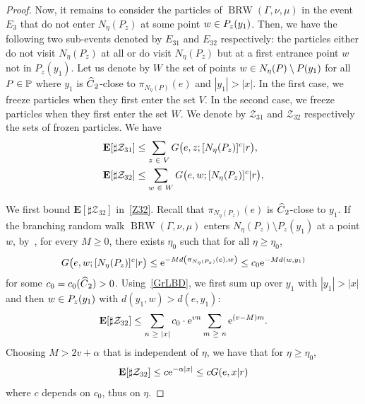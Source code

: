 \documentclass[AHL,Unicode,longabstracts]{cedram}
\newcommand{\bbP}{\mathbb{P}}
\newcommand{\rme}{\mathrm{e}}
\newcommand{\bfE}{\mathbf{E}}
\newcommand{\clZ}{\mathcal{Z}}
\DeclareMathOperator{\BRW}{BRW}
\let\originalleft\left
\let\originalright\right
\renewcommand{\left}{\mathopen{}\mathclose\bgroup\originalleft}
\renewcommand{\right}{\aftergroup\egroup\originalright}
\let\oldin\in
\renewcommand{\in}{\mathchoice{\oldin}{\oldin}{\,\oldin\,}{\,\oldin\,}}
\let\oldge\ge
\renewcommand{\ge}{\mathchoice{\oldge}{\oldge}{\,\oldge\,}{\,\oldge\,}}
\let\oldle\le
\renewcommand{\le}{\mathchoice{\oldle}{\oldle}{\,\oldle\,}{\,\oldle\,}}
\let\oldhat\hat
\renewcommand*{\hat}[1]{\mathchoice{\widehat{#1}}{\widehat{#1}}{\oldhat{#1}}{\oldhat{#1}}}
\begin{document}
\begin{proof}
Now, it remains to consider the particles of $\BRW(\Gamma,\nu,\mu)$ in the event $E_3$ that do not enter $N_\eta(P_z)$ at some point $w\in P_z(y_1)$. Then, we have the following two sub-events denoted by $E_{31}$ and $E_{32}$ respectively: the particles either do not visit $N_\eta(P_z)$ at all or do visit $N_\eta(P_z)$ but at a first entrance point $w$ not in $P_z(y_1)$. Let us denote by $W$ the set of points $w\in N_\eta(P)\setminus P(y_1)$ for all $P\in \bbP$ where $y_1$ is $\hat C_2$-close to $ \pi_{N_\eta(P)}(e)$ and $|y_1|>|x|$. In the first case, we freeze particles when they first enter the set $V$. In the second case, we freeze particles when they first enter the set $W$. We denote by $\clZ_{31}$ and $\clZ_{32}$ respectively the sets of frozen particles. We have
\begin{align}
\bfE[\sharp \clZ_{31}]&\leq \sum_{z\in V} G\bigl(e,z;[N_\eta(P_z)]^c|r\bigr),\label{Z31}\\
\bfE[\sharp \clZ_{32}]&\leq \sum_{w\in W} G\bigl(e,w;[N_\eta(P_z)]^c|r\bigr),\label{Z32}
\end{align}


We first bound $\bfE[\sharp \clZ_{32}]$ in~\eqref{Z32}. Recall that $\pi_{N_{\eta}(P_z)}(e)$ is $\hat C_2$-close to $y_1$. If the branching random walk $\BRW(\Gamma,\nu,\mu)$ enters $N_\eta(P_z)\setminus P_z(y_1)$ at a point $w$, by~\cite[Lemma~2.12]{DWY}, for every $M\geq 0$, there exists $\eta_0$ such that for all $\eta\geq \eta_0$,
\[
G\bigl(e,w;[N_\eta(P_z)]^c|r\bigr)\leq \rme^{-M d\left(\pi_{N_{\eta}(P_z)}(e),w\right)}\leq c_0 \rme^{-M d(w,y_1)}
\]
for some $c_0=c_0(\hat C_2)>0$. Using~\eqref{GrLBD}, we first sum up over $y_1$ with $|y_1|>|x|$ and then $w\in P_z(y_1)$ with $d(y_1, w)>d(e, y_1)$:
\[
\bfE[\sharp \clZ_{32}]\leq \sum_{n\ge |x|} c_0 \cdot \rme^{vn} \sum_{m\ge n} \rme^{(v- M)m}.
\]
Choosing $M>2v+\alpha$ that is independent of $\eta$, we have that for $\eta\geq \eta_0$,
\[
\bfE[\sharp \clZ_{32}]\leq c\rme^{-\alpha |x|} \le c G(e,x|r)
\]
where $c$ depends on $c_0$, thus on $\eta$.


\end{proof}
\end{document}
